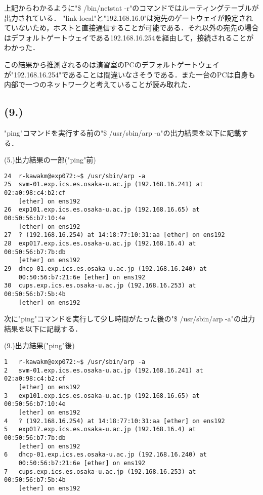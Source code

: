 \documentclass[a4j]{jarticle}
\newenvironment{bit}{\begin{breakitembox}}{\end{breakitembox}} %
\begin{document}
上記からわかるように"\$ /bin/netstat -r"のコマンドではルーティングテーブルが出力されている．
"link-local"と"192.168.16.0"は宛先のゲートウェイが設定されていないため，ホストと直接通信することが可能である．それ以外の宛先の場合はデフォルトゲートウェイである192.168.16.254を経由して，接続されることがわかった．

この結果から推測されるのは演習室のPCのデフォルトゲートウェイが"192.168.16.254"であることは間違いなさそうである．また一台のPCは自身も内部で一つのネットワークと考えていることが読み取れた．

\subsection{(9.)}

"ping"コマンドを実行する前の"\$ /usr/sbin/arp -a"の出力結果を以下に記載する．

\begin{bit}[l]{(5.)出力結果の一部("ping"前)}
\small{
\begin{verbatim}
24	r-kawakm@exp072:~$ /usr/sbin/arp -a
25	svm-01.exp.ics.es.osaka-u.ac.jp (192.168.16.241) at 02:a0:98:c4:b2:cf
    [ether] on ens192
26	exp101.exp.ics.es.osaka-u.ac.jp (192.168.16.65) at 00:50:56:b7:10:4e
    [ether] on ens192
27	? (192.168.16.254) at 14:18:77:10:31:aa [ether] on ens192
28	exp017.exp.ics.es.osaka-u.ac.jp (192.168.16.4) at 00:50:56:b7:7b:db
    [ether] on ens192
29	dhcp-01.exp.ics.es.osaka-u.ac.jp (192.168.16.240) at
    00:50:56:b7:21:6e [ether] on ens192
30	cups.exp.ics.es.osaka-u.ac.jp (192.168.16.253) at 00:50:56:b7:5b:4b
    [ether] on ens192
\end{verbatim}
}
\end{bit}

次に"ping"コマンドを実行して少し時間がたった後の"\$ /usr/sbin/arp -a"の出力結果を以下に記載する．

\begin{bit}[l]{(9.)出力結果("ping"後)}
\small{
\begin{verbatim}
1	r-kawakm@exp072:~$ /usr/sbin/arp -a
2	svm-01.exp.ics.es.osaka-u.ac.jp (192.168.16.241) at 02:a0:98:c4:b2:cf
    [ether] on ens192
3	exp101.exp.ics.es.osaka-u.ac.jp (192.168.16.65) at 00:50:56:b7:10:4e
    [ether] on ens192
4	? (192.168.16.254) at 14:18:77:10:31:aa [ether] on ens192
5	exp017.exp.ics.es.osaka-u.ac.jp (192.168.16.4) at 00:50:56:b7:7b:db
    [ether] on ens192
6	dhcp-01.exp.ics.es.osaka-u.ac.jp (192.168.16.240) at
    00:50:56:b7:21:6e [ether] on ens192
7	cups.exp.ics.es.osaka-u.ac.jp (192.168.16.253) at 00:50:56:b7:5b:4b
    [ether] on ens192
\end{verbatim}
}
\end{bit}
\end{document}
